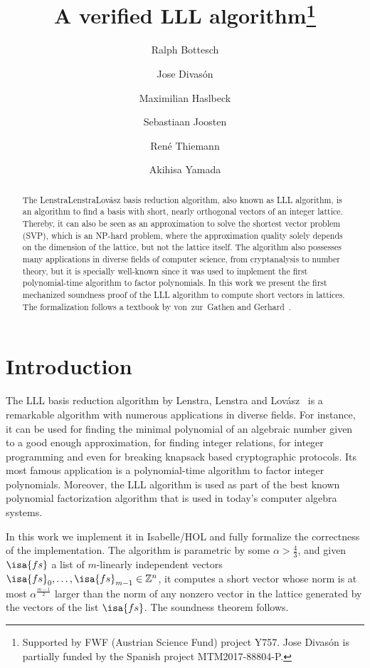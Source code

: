 \documentclass[11pt,a4paper]{article}
\newcommand\ints{\mathbb{Z}}
\newcommand\Base[2][m]{{#2}_0,\ldots,{#2}_{#1-1}}
\begin{document}
\title{A verified LLL algorithm\footnote{Supported by FWF (Austrian Science Fund) project Y757.
Jose Divas\'on is partially funded by the
Spanish project MTM2017-88804-P.}}
\author{Ralph Bottesch \and
  Jose Divas\'on \and
  Maximilian Haslbeck \and
  Sebastiaan Joosten \and
  Ren\'e Thiemann \and
  Akihisa Yamada}
\maketitle


\begin{abstract}
The Lenstra\textendash{}Lenstra\textendash{}Lov\'asz basis reduction algorithm, 
also known as LLL algorithm, is an algorithm 
to find a basis with short, nearly orthogonal vectors of an integer lattice. 
Thereby, it can also be seen as an approximation to solve the shortest vector problem (SVP), 
which is an NP-hard problem, where the approximation
quality solely depends on the dimension of the lattice, but not the lattice itself. 
The algorithm also possesses many applications in diverse fields of computer science, 
from cryptanalysis to number theory, but it is specially well-known 
since it was used to implement the first polynomial-time algorithm to factor polynomials.
In this work we present the first mechanized soundness proof of the LLL algorithm to compute 
short vectors in lattices. The formalization follows a textbook by von~zur~Gathen and Gerhard~\cite{MCA}.
\end{abstract}

\tableofcontents

\section{Introduction}

The LLL basis reduction algorithm by Lenstra, Lenstra and Lov\'asz~\cite{LLL} is a remarkable algorithm with 
numerous applications in diverse fields. For instance, it can be used for 
finding the minimal polynomial of an algebraic number given to a good enough approximation, for finding integer
relations, for integer programming and even for breaking knapsack based cryptographic protocols.
Its most famous application is a polynomial-time algorithm to factor integer polynomials.
Moreover, the LLL algorithm is used as part of the best known polynomial factorization algorithm 
that is used in today's computer algebra systems.

In this work we implement it in Isabelle/HOL and fully formalize the correctness of the implementation.
The algorithm is parametric by some $\alpha > \frac43$, and given $\isa{fs}$ a list of 
$m$-linearly independent vectors $\Base {\isa{fs}} \in \ints^n$, it computes a short vector whose norm is at most $\alpha^{\frac{m-1}2}$ larger 
than the norm of any nonzero vector in the lattice generated by the vectors of the list $\isa{fs}$.
The soundness theorem follows.
\end{document}
